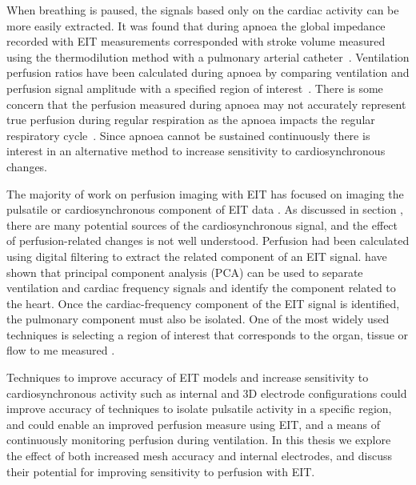 When breathing is paused, the signals based only on 
the cardiac activity can be more easily extracted. 
It was found that during apnoea the global impedance 
recorded with EIT measurements corresponded with stroke volume 
measured using the 
thermodilution method with a pulmonary arterial 
catheter~\parencite{fagerberg_electrical_2009}.
Ventilation perfusion ratios have been calculated during apnoea by comparing 
ventilation and perfusion signal amplitude with a specified region of 
interest~\parencite{fagerberg_electrical_2009}.
There is some concern that the perfusion measured 
during apnoea may not accurately represent 
true perfusion during regular respiration as the apnoea 
impacts the regular respiratory cycle~\parencite{leonhardt_electrical_2012}.
Since 
apnoea cannot be sustained continuously there is interest in an alternative method 
to increase sensitivity to cardiosynchronous changes. 

The majority of work on perfusion imaging with EIT has focused on imaging the pulsatile or 
cardiosynchronous component of EIT data \parencite{nguyen_review_2012}. 
As discussed in section , there are many potential sources of 
the cardiosynchronous signal, and the effect of perfusion-related changes is not well understood. 
Perfusion had been calculated using digital filtering to extract the related component
of an EIT signal. 
 have shown that principal component analysis (PCA) 
can be used to separate ventilation and cardiac frequency signals and identify the component 
related to the heart. Once the cardiac-frequency component of the 
EIT signal is identified, the pulmonary component must also be isolated. 
One of the most widely used techniques 
is selecting a region of interest that corresponds 
to the organ, tissue or flow to me measured
\parencite{braun_accuracy_2018,sola_non-invasive_2011}.

Techniques to improve accuracy of EIT models and increase sensitivity 
to cardiosynchronous activity 
such as internal and 3D electrode configurations could improve 
accuracy of techniques to isolate pulsatile
activity in a specific region, and could enable an 
improved perfusion measure 
using EIT, and a means of continuously monitoring perfusion during ventilation.
In this thesis we explore the effect of both increased mesh accuracy and internal electrodes,
and discuss their potential for improving sensitivity to perfusion with EIT.
























